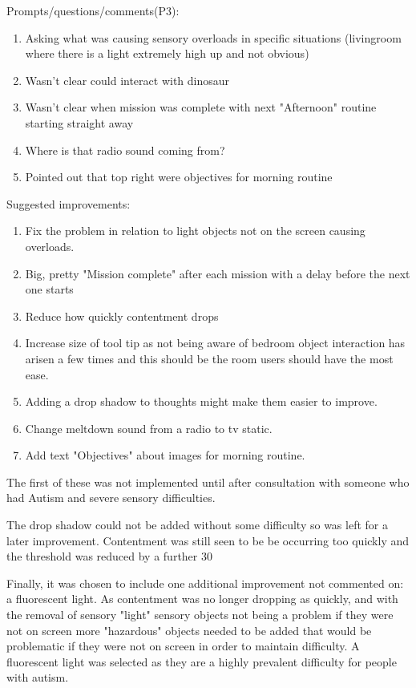 \documentclass[11pt]{report}
\begin{document}
Prompts/questions/comments(P3):
\begin{enumerate}
\item Asking what was causing sensory overloads in specific situations (livingroom where there is a light extremely high up and not obvious)
\item Wasn't clear could interact with dinosaur
\item Wasn't clear when mission was complete with next "Afternoon" routine starting straight away
\item Where is that radio sound coming from?
\item Pointed out that top right were objectives for morning routine
\end{enumerate}

Suggested improvements:
\begin{enumerate}
\item Fix the problem in relation to light objects not on the screen causing overloads.
\item Big, pretty "Mission complete" after each mission with a delay before the next one starts
\item Reduce how quickly contentment drops
\item Increase size of tool tip as not being aware of bedroom object interaction has arisen a few times and this should be the room users should have the most ease. 
\item Adding a drop shadow to thoughts might make them easier to improve.
\item Change meltdown sound from a radio to tv static. 
\item Add text "Objectives" about images for morning routine. 
\end{enumerate}

The first of these was not implemented until after consultation with someone who had Autism and severe sensory difficulties.

The drop shadow could not be added without some difficulty so was left for a later improvement. Contentment was still seen to be be occurring too quickly and the threshold was reduced by a further 30%

Finally, it was chosen to include one additional improvement not commented on: a fluorescent light. As contentment was no longer dropping as quickly, and with the removal of sensory "light" sensory objects not being a problem if they were not on screen more "hazardous" objects needed to be added that would be problematic if they were not on screen in order to maintain difficulty. A fluorescent light was selected as they are a highly prevalent difficulty for people with autism. 
\end{document}
